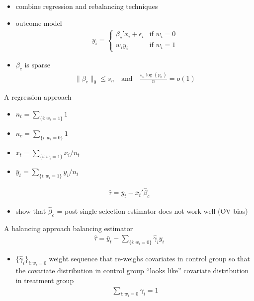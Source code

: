 \documentclass[xcolor=dvipsnames, handout]{beamer}
\begin{document}
\begin{frame}{\textcite{athey2018approximate}}
\begin{itemize}[<+->]
  \item combine regression and rebalancing techniques
  \item outcome model 
  \begin{align*}
    y_i = \begin{cases}
      \beta_{c}'x_i + \epsilon_i & \text{if $w_i = 0$}
    \\
       w_i y_i & \text{if $w_i = 1$}
    \end{cases}
  \end{align*}
  \item 
  $\beta_{c}$ is sparse
  \begin{align*}
    \lVert \beta_c \rVert_0 \leq s_n 
    \quad \text{and} \quad \frac{s_n \log(p_n)}{n} = o(1)
  \end{align*}
\end{itemize}
\end{frame}


\begin{frame}{A regression approach}
\begin{itemize}
  \item $n_t = \sum_{\{i: w_i = 1\}} 1$
  \item $n_c = \sum_{\{i: w_i = 0\}} 1$
  \item $\bar{x}_t = \sum_{\{i: w_i = 1\}} x_i / n_t$
  \item $\bar{y}_t = \sum_{\{i: w_i = 1\}} y_i / n_t$
\end{itemize}
\begin{align*}
  \hat{\tau} = \bar{y}_t - \bar{x}_t'\hat{\beta}_{c}
\end{align*}
\pause 
\begin{itemize}
  \item \textcite{belloni2014inference} show that $\hat{\beta}_c$ = post-single-selection estimator does not work well (OV bias)
\end{itemize}
\end{frame}


\begin{frame}{A balancing approach}
balancing estimator 
\begin{align*}
  \hat{\tau} = \bar{y}_t - \sum_{\{i:w_i = 0\}} \hat{\gamma}_i y_i
\end{align*}
\begin{itemize}
  \item $\{\hat{\gamma}_i\}_{i: w_i = 0}$ weight sequence that re-weighs covariates in control group so that the covariate distribution in control group ``looks like'' covariate distribution in treatment group
  \begin{align*}
    \sum_{i: w_i = 0} \hat{\gamma}_i = 1 
  \end{align*}
\end{itemize}
\end{frame}
\end{document}

